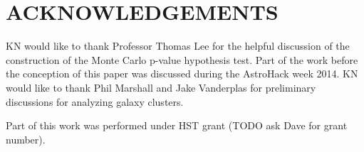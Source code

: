 \section{ACKNOWLEDGEMENTS}
KN would like to thank Professor Thomas Lee for the helpful discussion of 
the construction of the Monte Carlo p-value hypothesis test. 
Part of the work before the conception of this paper was discussed during 
the AstroHack week 2014. KN would like to thank Phil
Marshall and Jake Vanderplas for preliminary discussions for analyzing galaxy clusters. 


Part of this work was performed under HST grant (TODO ask Dave for grant
number). 







